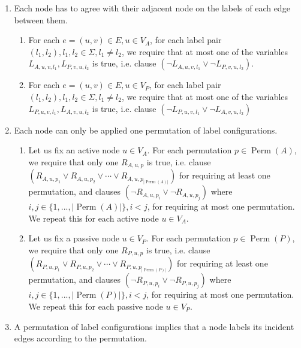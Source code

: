 \begin{enumerate}
\item
  Each node has to agree with their adjacent node on the labels of each edge between them.
  \begin{enumerate}
  \item
    For each $e=(u, v)\in E, u\in V_A$, for each label pair $(l_1, l_2), l_1, l_2 \in \Sigma, l_1 \neq l_2$, we require that at most one of the variables $L_{A,u,v,l_1}, L_{P,v,u,l_2}$ is true, i.e. clause $(\neg L_{A,u,v,l_1} \lor \neg L_{P,v,u,l_2})$.
    \label{enu:sat_conditions:1a}
  \item
    For each $e=(u, v)\in E, u\in V_P$, for each label pair $(l_1, l_2), l_1, l_2 \in \Sigma, l_1 \neq l_2$, we require that at most one of the variables $L_{P,u,v,l_1}, L_{A,v,u,l_2}$ is true, i.e. clause $(\neg L_{P,u,v,l_1} \lor \neg L_{A,v,u,l_2})$
    \label{enu:sat_conditions:1b}
  \end{enumerate}
\item
  Each node can only be applied one permutation of label configurations.
  \begin{enumerate}
  \item
    Let us fix an active node $u \in V_A$.
    For each permutation $p \in \operatorname{Perm}(A)$, we require that only one $R_{A, u, p}$ is true, i.e. clause $(R_{A, u, p_1} \lor R_{A, u, p_2} \lor \dotsm \lor R_{A, u, p_{|\operatorname{Perm}(A)|}})$ for requiring at least one permutation,
    and clauses
    $ (\neg R_{A, u, p_i} \lor \neg R_{A, u, p_j})$ where $i, j \in \{1, ..., |\operatorname{Perm}(A)|\}, i < j$,
    for requiring at most one permutation.
    We repeat this for each active node $u \in V_A$.
    \label{enu:sat_conditions:2a}
  \item
    Let us fix a passive node $u \in V_P$.
    For each permutation $p \in \operatorname{Perm}(P)$, we require that only one $R_{P, u, p}$ is true, i.e. clause $(R_{P, u, p_1} \lor R_{P, u, p_2} \lor \dotsm \lor R_{P, u, p_{|\operatorname{Perm}(P)|}})$ for requiring at least one permutation,
    and clauses
    $ (\neg R_{P, u, p_i} \lor \neg R_{P, u, p_j})$ where $i, j \in \{1, ..., |\operatorname{Perm}(P)|\}, i < j$,
    for requiring at most one permutation.
    We repeat this for each passive node $u \in V_P$.
    \label{enu:sat_conditions:2b}
  \end{enumerate}
\item
  A permutation of label configurations implies that a node labels its incident edges according to the permutation.
  \begin{enumerate}

\end{enumerate}
\end{enumerate}
